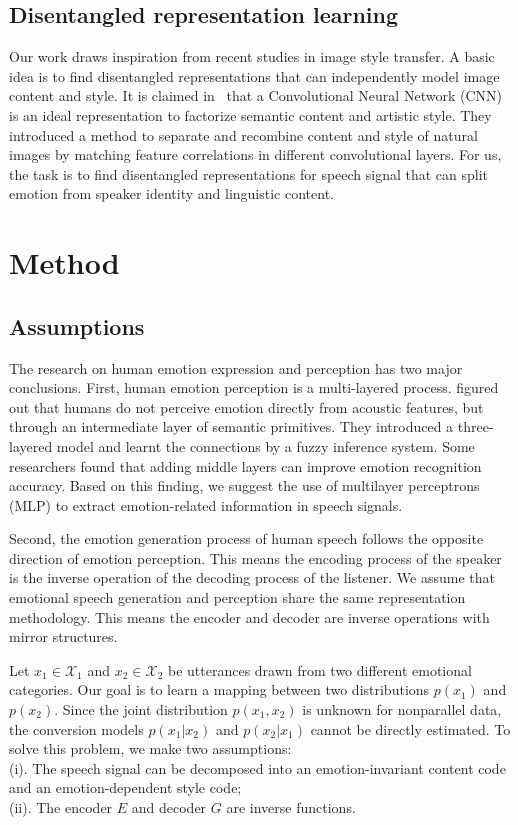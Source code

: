 \documentclass{article}
\begin{document}
\subsection{Disentangled representation learning}
Our work draws inspiration from recent studies in image style transfer. A basic idea is to find disentangled representations that can independently model image content and style. It is claimed in~\cite{gatys2016image} that a Convolutional Neural Network (CNN) is an ideal representation to factorize semantic content and artistic style. They introduced a method to separate and recombine content and style of natural images by matching feature correlations in different convolutional layers. For us, the task is to find disentangled representations for speech signal that can split emotion from speaker identity and linguistic content.



\section{Method}
\label{sec:method}

\subsection{Assumptions}
The research on human emotion expression and perception has two major conclusions.
First, human emotion perception is a multi-layered process. \cite{huang2008three} figured out that humans do not perceive emotion directly from acoustic features, but through an intermediate layer of semantic primitives. They introduced a three-layered model and learnt the connections by a fuzzy inference system. Some researchers found that adding middle layers can improve emotion recognition accuracy. Based on this finding, we suggest the use of multilayer perceptrons (MLP) to extract emotion-related information in speech signals.

Second, the emotion generation process of human speech follows the opposite direction of emotion perception. This means the encoding process of the speaker is the inverse operation of the decoding process of the listener. We assume that emotional speech generation and perception share the same representation methodology. This means the encoder and decoder are inverse operations with mirror structures.

Let $x_1 \in \mathcal{X}_1$ and $x_2 \in \mathcal{X}_2$ be utterances drawn from two different emotional categories. Our goal is to learn a mapping between two distributions $p(x_1)$ and $p(x_2)$. Since the joint distribution $p(x_1, x_2)$ is unknown for nonparallel data, the conversion models $p(x_1|x_2)$ and $p(x_2|x_1)$ cannot be directly estimated. To solve this problem, we make two assumptions: \\
(i). The speech signal can be decomposed into an emotion-invariant content code and an emotion-dependent style code; \\
(ii). The encoder $E$ and decoder $G$ are inverse functions.
\end{document}
